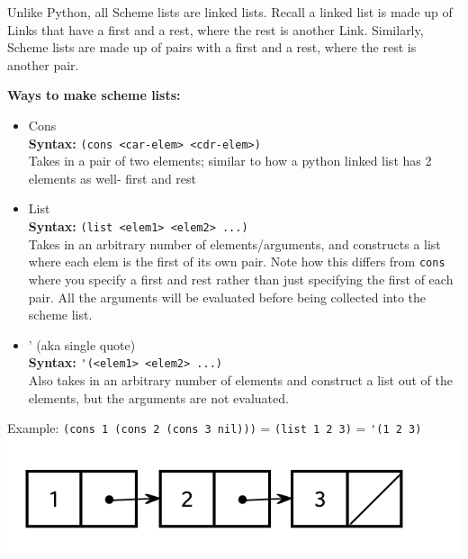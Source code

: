 Unlike Python, all Scheme lists are linked lists. Recall a linked list is made up of Links that have a first and a rest, where the rest is another Link. Similarly, Scheme lists are made up of pairs with a first and a rest, where the rest is another pair.

\textbf{Ways to make scheme lists:}
\begin{itemize}
\item Cons \\
\textbf{Syntax:} \lstinline{(cons <car-elem> <cdr-elem>)} \\
Takes in a pair of two elements; similar to how a python linked list has 2 elements as well- first and rest
\item List \\
\textbf{Syntax:} \lstinline{(list <elem1> <elem2> ...)} \\
Takes in an arbitrary number of elements/arguments, and constructs a list where each elem is the first of its own pair. Note how this differs from \lstinline{cons} where you specify a first and rest rather than just specifying the first of each pair. All the arguments will be evaluated before being collected into the scheme list.
\item ' (aka single quote) \\
\textbf{Syntax:} \lstinline{'(<elem1> <elem2> ...)} \\
Also takes in an arbitrary number of elements and construct a list out of the elements, but the arguments are not evaluated.
\end{itemize}
Example:
\lstinline{(cons 1 (cons 2 (cons 3 nil)))} = \lstinline{(list 1 2 3)} = \lstinline{'(1 2 3)}
\includegraphics[scale=0.6]{scheme_list}

